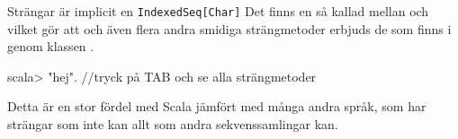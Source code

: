 




\begin{Slide}{Strängar är implicit en \texttt{IndexedSeq[Char]}}\SlideFontSmall
Det finns en så kallad  mellan  och  vilket gör att  och även flera andra smidiga strängmetoder erbjuds  de som finns i \href{http://docs.oracle.com/javase/8/docs/api/java/lang/String.html}{} genom klassen \href{http://www.scala-lang.org/api/current/scala/collection/immutable/StringOps.html}{}.

\vspace{0.5em}
\begin{REPLnonum}
scala> "hej".  //tryck på TAB och se alla strängmetoder
\end{REPLnonum}
Detta är en stor fördel med Scala jämfört med många andra språk, som har strängar som inte kan allt som andra sekvenssamlingar kan.
\end{Slide}


